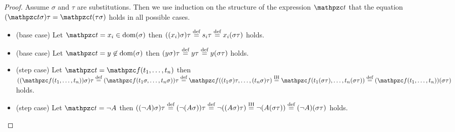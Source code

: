 \begin{proof}
	Assume $\sigma$ and $\tau$ are substitutions. 
	Then we use induction on the structure of the 	expression $\mct$
	that the equation $(\mct\sigma)\tau =  \mct(\tau\sigma)$ holds in all possible cases.
	\begin{itemize}
		\item (base case) Let $\mct = x_i \in\domain(\sigma)$ then
		$((x_i)\sigma)\tau\defEQ s_i\tau\defEQ x_i(\sigma\tau)$ holds.
		
		\item (base case) Let $\mct = y \not\in\domain(\sigma)$ then
		$(y\sigma)\tau \defEQ y\tau \defEQ y(\sigma\tau)$ holds. 
		
		\item (step case) Let $\mct = \mcf(t_1,\ldots,t_n)$ 
		then
		$((\mcf(t_1,\ldots,t_n))\sigma)\tau
		\defEQ 
		(\mcf(t_1\sigma,\ldots,t_n\sigma))\tau
		\defEQ 
		\mcf((t_1\sigma)\tau,\ldots,(t_n\sigma)\tau)
		\defEQ[IH]
		\mcf(t_1(\sigma\tau),\ldots,t_n(\sigma\tau))
		\defEQ
		(\mcf(t_1,\ldots,t_n))(\sigma\tau)
		$ holds.
		
		\item (step case) Let $\mct = \lnot A$ then
		$((\lnot A)\sigma)\tau 
		\defEQ 
		(\lnot(A\sigma))\tau 
		\defEQ 
		\lnot((A\sigma)\tau)
		\defEQ[IH]
		\lnot(A(\sigma\tau))
		\defEQ 
		(\lnot A)(\sigma\tau)
		$ holds.
	\end{itemize}
\end{proof}
